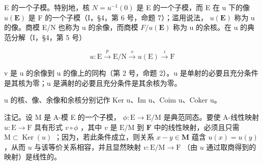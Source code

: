 E 的一个子模。特别地，核 \(N = u^{-1}(0)\) 是 E 的一个子模，而 E 在 u 下的像 \(u(\mathbf{E})\) 是 F 的一个子模（I，§4，第 6 号，命题 7）；滥用说法， \(u(\mathbf{E})\) 称为 u 的像。商模 E/N 也称为 u 的余像，而商模 \(F/u(\mathbf{E})\) 称为 u 的余核。在 u 的典范分解（I，§4，第 5 号）

\[
u: \mathrm{E} \xrightarrow {p} \mathrm{E} / \mathrm{N} \xrightarrow {v} u (\mathrm{E}) \xrightarrow {i} \mathrm{F}\tag{11}
\]

v 是 u 的余像到 u 的像上的同构（第 2 号，命题 2）。u 是单射的必要且充分条件是其核为零；u 是满射的必要且充分条件是其余核为零。

u 的核、像、余像和余核分别记作 Ker u、Im u、Coim u、Coker u。

注记。设 M 是 A-模 E 的一个子模， \(\phi: \mathrm{E} \to \mathrm{E} / \mathrm{M}\) 是典范同态。要使 A-线性映射 \(u: \mathrm{E} \to \mathrm{F}\) 具有形式 \(v \circ \phi\) ，其中 \(v\) 是 \(\mathrm{E} / \mathrm{M}\) 到 \(\mathbf{F}\) 中的线性映射，必须且只需 \(\mathrm{M} \subset \operatorname{Ker}(u)\) ；因为，若此条件成立，则关系 \(x - y \in \mathbf{M}\) 蕴含 \(u(x) = u(y)\) ，从而 \(u\) 与该等价关系相容，并且显然映射 \(v: \mathrm{E} / \mathrm{M} \to \mathrm{F}\) （由 \(u\) 通过取商得到的映射）是线性的。

